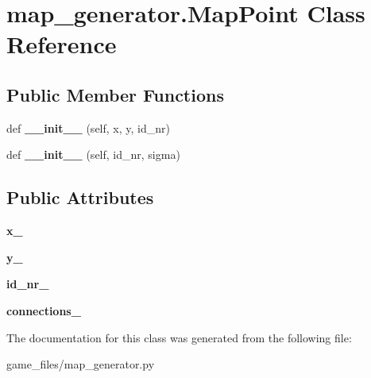\hypertarget{classmap__generator_1_1MapPoint}{}\section{map\+\_\+generator.\+Map\+Point Class Reference}
\label{classmap__generator_1_1MapPoint}
\subsection*{Public Member Functions}
\begin{DoxyCompactItemize}
\item 
def {\bfseries \+\_\+\+\_\+init\+\_\+\+\_\+} (self, x, y, id\+\_\+nr)\hypertarget{classmap__generator_1_1MapPoint_a163391a4f7af79b57e227f75f0109250}{}\label{classmap__generator_1_1MapPoint_a163391a4f7af79b57e227f75f0109250}

\item 
def {\bfseries \+\_\+\+\_\+init\+\_\+\+\_\+} (self, id\+\_\+nr, sigma)\hypertarget{classmap__generator_1_1MapPoint_a850b4f9a900b72196c5658cb169dfdb1}{}\label{classmap__generator_1_1MapPoint_a850b4f9a900b72196c5658cb169dfdb1}

\end{DoxyCompactItemize}
\subsection*{Public Attributes}
\begin{DoxyCompactItemize}
\item 
{\bfseries x\+\_\+}\hypertarget{classmap__generator_1_1MapPoint_a30f127d86ed0f4a141eb9a199c436903}{}\label{classmap__generator_1_1MapPoint_a30f127d86ed0f4a141eb9a199c436903}

\item 
{\bfseries y\+\_\+}\hypertarget{classmap__generator_1_1MapPoint_affb31ca8f5efc48bb286cadce5cba186}{}\label{classmap__generator_1_1MapPoint_affb31ca8f5efc48bb286cadce5cba186}

\item 
{\bfseries id\+\_\+nr\+\_\+}\hypertarget{classmap__generator_1_1MapPoint_a9767c12af93e4f325f174b34931591af}{}\label{classmap__generator_1_1MapPoint_a9767c12af93e4f325f174b34931591af}

\item 
{\bfseries connections\+\_\+}\hypertarget{classmap__generator_1_1MapPoint_a39f10f2cecb2de829e00d1856290636f}{}\label{classmap__generator_1_1MapPoint_a39f10f2cecb2de829e00d1856290636f}

\end{DoxyCompactItemize}


The documentation for this class was generated from the following file\+:\begin{DoxyCompactItemize}
\item 
game\+\_\+files/map\+\_\+generator.\+py\end{DoxyCompactItemize}
